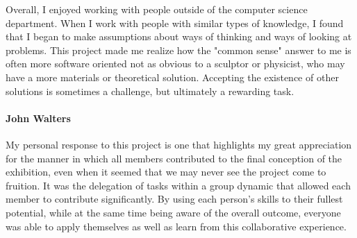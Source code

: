 Overall, I enjoyed working with people outside of the computer science department. When I work with people with similar types of knowledge, I found that I began to make assumptions about ways of thinking and ways of looking at problems. This project made me realize how the "common sense" answer to me is often more software oriented not as obvious to a sculptor or physicist, who may have a more materials or theoretical solution. Accepting the existence of other solutions is sometimes a challenge, but ultimately a rewarding task.

\paragraph{John Walters}
My personal response to this project is one that highlights my great appreciation for the manner in which all members contributed to the final conception of the exhibition, even when it seemed that we may never see the project come to fruition. It was the delegation of tasks within a group dynamic that allowed each member to contribute significantly. By using each person’s skills to their fullest potential, while at the same time being aware of the overall outcome, everyone was able to apply themselves as well as learn from this collaborative experience.    

